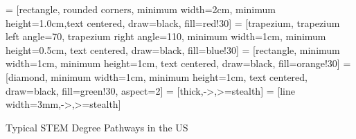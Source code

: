  = [rectangle, rounded corners, minimum width=2cm, minimum height=1.0cm,text centered, draw=black, fill=red!30]
 = [trapezium, trapezium left angle=70, trapezium right angle=110, minimum width=1cm, minimum height=0.5cm, text centered, draw=black, fill=blue!30]
 = [rectangle, minimum width=1cm, minimum height=1cm, text centered, draw=black, fill=orange!30]
 = [diamond, minimum width=1cm, minimum height=1cm, text centered, draw=black, fill=green!30, aspect=2]
 = [thick,->,>=stealth]
 = [line width=3mm,->,>=stealth]

\begin{frame}[fragile]{Typical STEM Degree Pathways in the US}
    \begin{center}
    \end{center}
\end{frame}
